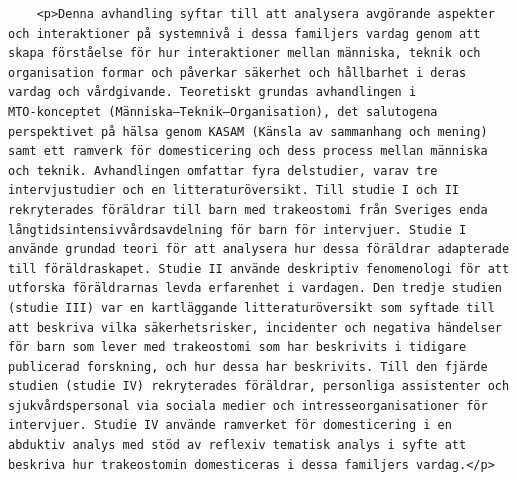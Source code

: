 \begin{casestudySection}
\begin{lstlisting}
    <p>Denna avhandling syftar till att analysera avgörande aspekter och interaktioner på systemnivå i dessa familjers vardag genom att skapa förståelse för hur interaktioner mellan människa, teknik och organisation formar och påverkar säkerhet och hållbarhet i deras vardag och vårdgivande. Teoretiskt grundas avhandlingen i MTO‑konceptet (Människa–Teknik–Organisation), det salutogena perspektivet på hälsa genom KASAM (Känsla av sammanhang och mening) samt ett ramverk för domesticering och dess process mellan människa och teknik. Avhandlingen omfattar fyra delstudier, varav tre intervjustudier och en litteraturöversikt. Till studie I och II rekryterades föräldrar till barn med trakeostomi från Sveriges enda långtidsintensivvårdsavdelning för barn för intervjuer. Studie I använde grundad teori för att analysera hur dessa föräldrar adapterade till föräldraskapet. Studie II använde deskriptiv fenomenologi för att utforska föräldrarnas levda erfarenhet i vardagen. Den tredje studien (studie III) var en kartläggande litteraturöversikt som syftade till att beskriva vilka säkerhetsrisker, incidenter och negativa händelser för barn som lever med trakeostomi som har beskrivits i tidigare publicerad forskning, och hur dessa har beskrivits. Till den fjärde studien (studie IV) rekryterades föräldrar, personliga assistenter och sjukvårdspersonal via sociala medier och intresseorganisationer för intervjuer. Studie IV använde ramverket för domesticering i en abduktiv analys med stöd av reflexiv tematisk analys i syfte att beskriva hur trakeostomin domesticeras i dessa familjers vardag.</p>

\end{lstlisting}
\end{casestudySection}
